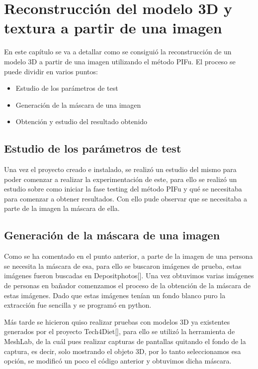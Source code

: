 \chapter{Reconstrucción del modelo 3D y textura a partir de una imagen}
\label{Reconstrucción}
En este capítulo se va a detallar como se consiguió la reconstrucción de un modelo 3D a partir de una imagen utilizando el método PIFu. El proceso se puede dividir en varios puntos:

\begin{itemize}
	\item Estudio de los parámetros de test
	\item Generación de la máscara de una imagen
	\item Obtención y estudio del resultado obtenido
\end{itemize}

\section{Estudio de los parámetros de test}

Una vez el proyecto creado e instalado, se realizó un estudio del mismo para poder comenzar a realizar la experimentación de este, para ello se realizó un estudio sobre como iniciar la fase testing del método PIFu y qué se necesitaba para comenzar a obtener resultados. Con ello pude observar que se necesitaba a parte de la imagen la máscara de ella.

\section{Generación de la máscara de una imagen}

Como se ha comentado en el punto anterior, a parte de la imagen de una persona se necesita la máscara de esa, para ello se buscaron imágenes de prueba, estas imágenes fueron buscadas en Depositphotos[]. Una vez obtuvimos varias imágenes de personas en bañador comenzamos el proceso de la obtención de la máscara de estas imágenes. Dado que estas imágenes tenían un fondo blanco puro la extracción fue sencilla y se programó en python.

Más tarde se hicieron quiso realizar pruebas con modelos 3D ya existentes generados por el proyecto Tech4Diet[\cite{tech}], para ello se utilizó la herramienta de MeshLab, de la cuál pues realizar capturas de pantallas quitando el fondo de la captura, es decir, solo mostrando el objeto 3D, por lo tanto seleccionamos esa opción, se modificó un poco el código anterior y obtuvimos dicha máscara.

